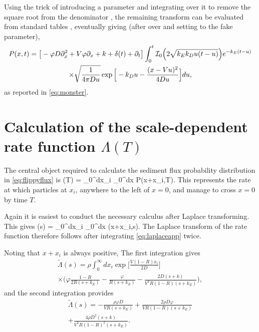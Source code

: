 Using the trick of introducing a parameter and integrating over it to remove the square root from the denominator \DIFaddbegin {}\DIFaddend , the remaining transform can be evaluated from standard tables \citep{Prudnikov1992a}, eventually giving (after \DIFdelbegin {}\DIFdelend \DIFaddbegin {}\DIFaddend over and setting to \DIFdelbegin {}\DIFdelend \DIFaddbegin {}\DIFaddend the fake parameter),
\begin{multline} P(x,t) = \big[-\varphi D\partial_x^2 + V\varphi \partial_x + k + \delta(t)+ \partial_t \big]\int_0^t \mathcal{I}_0\Big( 2 \sqrt{k_Ek_D u(t-u)}\Big) e^{-k_E(t-u)} \\ \times \sqrt{ \frac{1}{4\pi D u}} \exp\Big[-k_D u - \frac{(x-Vu)^2}{4Du}\Big] du, \end{multline}
as reported in \DIFdelbegin {}\DIFdelend \DIFaddbegin {}\DIFaddend \ref{eq:monster}.


\section{Calculation of the scale-dependent rate function $\Lambda(T)$}
\label{sec:fluxconstant}
The central object required to calculate the sediment flux probability distribution in \DIFdelbegin {}\DIFdelend \DIFaddbegin {}\DIFaddend \ref{eq:flippyflux} is 
\be \Lambda(T) = \rho \int_0^\infty dx_i \int_0^\infty dx P(x+x_i,T).\ee
This represents the rate at which particles \DIFdelbegin {}\DIFdelend \DIFaddbegin {}\DIFaddend at $x_i$, anywhere to the left of $x=0$, and manage to cross $x=0$ by time $T$.

Again it is easiest to conduct the necessary calculus after Laplace transforming. This gives 
\be \tilde{\Lambda}(s) = \rho \int_0^\infty dx_i \int_0^\infty dx (x+x_i,s).\ee
The Laplace transform of the rate function therefore follows after integrating \DIFdelbegin {}\DIFdelend \DIFaddbegin {}\DIFaddend \ref{eq:laplaceapp} twice.

Noting that $x+x_i$ is always positive,
The first integration gives
\begin{multline} \tilde{\Lambda}(s) = \rho \int_0^\infty dx_i \exp\Big[\frac{V(1-R)x_i}{2D}\Big]\\ 
	\times\Big(\varphi \frac{1-R}{2R(s+k_E)} - \frac{\varphi}{R(s+k_E)} - \frac{2D(s+k)}{V^2R(1-R)(s+k_E)}\Big), \end{multline}
and the second integration provides
\begin{multline}  \tilde{\Lambda}(s) = -\frac{\rho \varphi D}{V R(s+k_E)}  + \frac{2\rho D\varphi}{VR(1-R)(s+k_E)} \\ + \frac{4\rho D^2(s+k)}{V^3R(1-R)^2(s+k_E)}. 
	\label{eq:laplacefluxrate}\end{multline}

